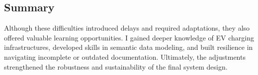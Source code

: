 \subsection*{Summary}
Although these difficulties introduced delays and required adaptations, they also offered valuable learning opportunities. I gained deeper knowledge of EV charging infrastructures, developed skills in semantic data modeling, and built resilience in navigating incomplete or outdated documentation. Ultimately, the adjustments strengthened the robustness and sustainability of the final system design.






